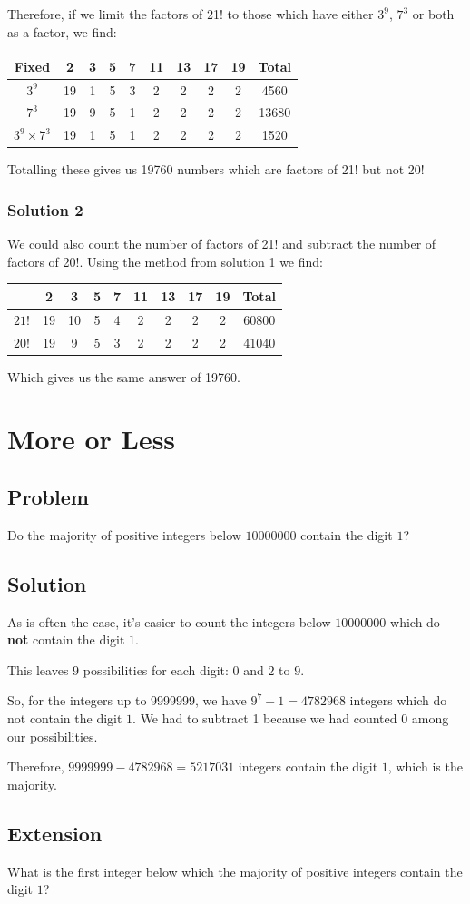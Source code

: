 \documentclass{book}
\begin{document}
Therefore, if we limit the factors of 21! to those which have either \(3^9\), \(7^3\) or both as a factor, we find:
\begin{center}
\begin{tabular}{ |c|c|c|c|c|c|c|c|c|c| }
\hline
Fixed & 2 & 3 & 5 & 7 & 11 & 13 & 17 & 19 & Total \\
\hline
\(3^9\) & 19 & 1 & 5 & 3 & 2 & 2 & 2 & 2 & 4560\\
\(7^3\) & 19 & 9 & 5 & 1 & 2 & 2 & 2 & 2 & 13680\\
\(3^9 \times 7^3\) & 19 & 1 & 5 & 1 & 2 & 2 & 2 & 2 & 1520\\
\hline
\end{tabular}
\end{center}
Totalling these gives us 19760 numbers which are factors of 21! but not 20!

\subsubsection{Solution 2}
We could also count the number of factors of 21! and subtract the number of factors of 20!. Using the method from solution 1 we find:
\begin{center}
\begin{tabular}{ |c|c|c|c|c|c|c|c|c|c| }
\hline
 & 2 & 3 & 5 & 7 & 11 & 13 & 17 & 19 & Total \\
\hline
\(21!\) & 19 & 10 & 5 & 4 & 2 & 2 & 2 & 2 & 60800\\
\(20!\) & 19 & 9 & 5 & 3 & 2 & 2 & 2 & 2 & 41040\\
\hline
\end{tabular}
\end{center}
Which gives us the same answer of 19760.
\newpage
\section{More or Less}
\subsection{Problem}
Do the majority of positive integers below \(10 000 000\) contain the digit \(1\)?
\subsection{Solution}
As is often the case, it's easier to count the integers below \(10000000\) which do \textbf{not} contain the digit \(1\).

This leaves \(9\) possibilities for each digit: \(0\) and \(2\) to \(9\).

So, for the integers up to 9999999, we have \(9^7-1=4782968\) integers which do not contain the digit \(1\). We had to subtract 1 because we had counted 0 among our possibilities.

Therefore, \(9999999-4782968=5217031\) integers contain the digit \(1\), which is the majority.
\subsection{Extension}
What is the first integer below which the majority of positive integers contain the digit \(1\)?
\end{document}
